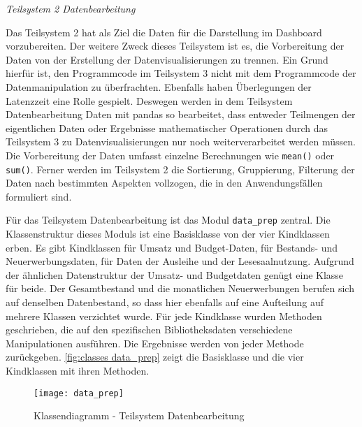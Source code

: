     \noindent
    \textit{Teilsystem 2 Datenbearbeitung}

    Das Teilsystem 2 hat als Ziel die Daten für die Darstellung im Dashboard vorzubereiten. Der weitere Zweck dieses
    Teilsystem ist es, die Vorbereitung der Daten von der Erstellung der Datenvisualisierungen zu trennen. Ein Grund hierfür
    ist, den Programmcode im Teilsystem 3 nicht mit dem Programmcode der Datenmanipulation zu überfrachten. Ebenfalls haben Überlegungen
    der Latenzzeit eine Rolle gespielt. Deswegen werden in dem Teilsystem Datenbearbeitung Daten mit pandas so bearbeitet, 
    dass entweder Teilmengen der eigentlichen Daten oder Ergebnisse mathematischer Operationen durch das Teilsystem 3 
    zu Datenvisualisierungen nur noch weiterverarbeitet werden müssen. Die Vorbereitung der Daten umfasst einzelne Berechnungen 
    wie \texttt{mean()} oder \texttt{sum()}. Ferner werden im Teilsystem 2 die Sortierung, Gruppierung, Filterung der 
    Daten nach bestimmten Aspekten vollzogen, die in den Anwendungsfällen formuliert sind.
    
    Für das Teilsystem Datenbearbeitung ist das Modul \texttt{data\_prep} zentral. Die Klassenstruktur dieses Moduls ist eine 
    Basisklasse von der vier Kindklassen erben. Es gibt Kindklassen für Umsatz und Budget-Daten, für Bestands- und Neuerwerbungsdaten, für Daten der Ausleihe und 
    der Lesesaalnutzung. Aufgrund der ähnlichen Datenstruktur der Umsatz- und Budgetdaten genügt eine Klasse für beide.
    Der Gesamtbestand und die monatlichen Neuerwerbungen berufen sich auf denselben Datenbestand, so dass hier ebenfalls auf eine Aufteilung auf mehrere Klassen verzichtet wurde.
    Für jede Kindklasse wurden Methoden geschrieben, die auf den spezifischen Bibliotheksdaten verschiedene Manipulationen ausführen.
    Die Ergebnisse werden von jeder Methode zurückgeben. \autoref{fig:classes data_prep} zeigt die Basisklasse und die vier Kindklassen mit ihren Methoden.


    \begin{figure}[H]
        \centering
            \texttt{[image: data\_prep]}
            \caption{Klassendiagramm - Teilsystem Datenbearbeitung}
            \label{fig:classes data_prep}
    \end{figure}

